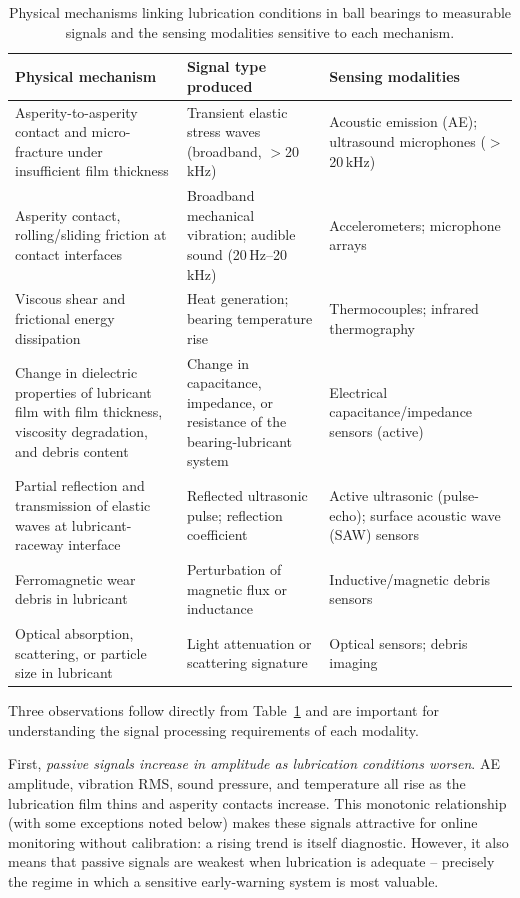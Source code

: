 \begin{table}[H]
\scriptsize
\centering
\begin{tabularx}{\linewidth}{| >{\raggedright\arraybackslash}p{2.8cm} | >{\raggedright\arraybackslash}p{3cm} | X |}
\hline
\textbf{Physical mechanism} & \textbf{Signal type produced} & \textbf{Sensing modalities} \\
\hline
Asperity-to-asperity contact and micro-fracture under insufficient film thickness & Transient elastic stress waves (broadband, $>$20\,kHz) & Acoustic emission (AE); ultrasound microphones ($>$20\,kHz) \\
\hline
Asperity contact, rolling/sliding friction at contact interfaces & Broadband mechanical vibration; audible sound (20\,Hz--20\,kHz) & Accelerometers; microphone arrays \\
\hline
Viscous shear and frictional energy dissipation & Heat generation; bearing temperature rise & Thermocouples; infrared thermography \\
\hline
Change in dielectric properties of lubricant film with film thickness, viscosity degradation, and debris content & Change in capacitance, impedance, or resistance of the bearing-lubricant system & Electrical capacitance/impedance sensors (active) \\
\hline
Partial reflection and transmission of elastic waves at lubricant-raceway interface & Reflected ultrasonic pulse; reflection coefficient & Active ultrasonic (pulse-echo); surface acoustic wave (SAW) sensors \\
\hline
Ferromagnetic wear debris in lubricant & Perturbation of magnetic flux or inductance & Inductive/magnetic debris sensors \\
\hline
Optical absorption, scattering, or particle size in lubricant & Light attenuation or scattering signature & Optical sensors; debris imaging \\
\hline
\end{tabularx}
\caption{Physical mechanisms linking lubrication conditions in ball bearings to measurable signals and the sensing modalities sensitive to each mechanism.}
\label{tab:signal_origins}
\end{table}

Three observations follow directly from Table~\ref{tab:signal_origins} and are important for understanding the signal processing requirements of each modality.

First, \textit{passive signals increase in amplitude as lubrication conditions worsen}. AE amplitude, vibration RMS, sound pressure, and temperature all rise as the lubrication film thins and asperity contacts increase. This monotonic relationship (with some exceptions noted below) makes these signals attractive for online monitoring without calibration: a rising trend is itself diagnostic. However, it also means that passive signals are weakest when lubrication is adequate -- precisely the regime in which a sensitive early-warning system is most valuable.

